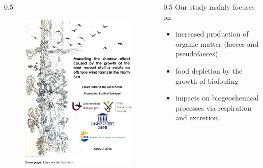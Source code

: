 \documentclass[final,xcolor=dvipsnames]{beamer}
\begin{document}
      \begin{frame}
	\begin{exampleblock}{}
	  \begin{columns}
	    \begin{column}{0.5\framewidth}
	      \begin{figure}
		\centering
		\includegraphics[width=.9\columnwidth]{./Figs/Context.png}
		\label{fig:my_label}
	      \end{figure}
	    \end{column}
	    \begin{column}{0.5\framewidth}
	      Our study mainly focuses on 
	      \begin{itemize}
		\item increased production of organic matter (faeces and pseudofaeces)
		\item food depletion by the growth of biofouling %
		\item impacts on biogeochemical processes via respiration and excretion. 
	      \end{itemize}
	    \end{column}
	  \end{columns}
	\end{exampleblock}
      \end{frame}
      
\end{document}
